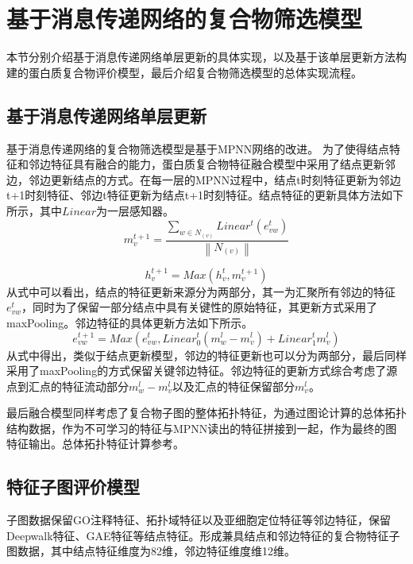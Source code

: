 \section{基于消息传递网络的复合物筛选模型}
\label{section:MPNN:detail}

本节分别介绍基于消息传递网络单层更新的具体实现，以及基于该单层更新方法构建的蛋白质复合物评价模型，最后介绍复合物筛选模型的总体实现流程。
\subsection{基于消息传递网络单层更新}
基于消息传递网络的复合物筛选模型是基于MPNN网络的改进。
为了使得结点特征和邻边特征具有融合的能力，蛋白质复合物特征融合模型中采用了结点更新邻边，邻边更新结点的方式。在每一层的MPNN过程中，结点t时刻特征更新为邻边t+1时刻特征、邻边t特征更新为结点t+1时刻特征。结点特征的更新具体方法如下所示，其中$Linear$为一层感知器。
\begin{equation}
    \label{equ:MineMPNNPassing}
    m_v^{t+1} = \frac{\sum_{w \in N_{(v)}}Linear^t(e_{vw}^t)}{\left\lVert N_{(v)}\right\rVert }
\end{equation}

\begin{equation}
    \label{equ:MineMPNNReadout}
    h_v^{t+1} = Max(h_v^t,m_v^{t+1})
\end{equation}
从式中可以看出，结点的特征更新来源分为两部分，其一为汇聚所有邻边的特征$e_{vw}^t$，同时为了保留一部分结点中具有关键性的原始特征，其更新方式采用了maxPooling。邻边特征的具体更新方法如下所示。
\begin{equation}
    \label{equ:MineMPNNedge}
    e_{vw}^{t+1} = Max(e_{vw}^t,Linear_0^t(m_w^{l} - m_v^{l}) + Linear_1^t m_v^{l})
\end{equation}
从式中得出，类似于结点更新模型，邻边的特征更新也可以分为两部分，最后同样采用了maxPooling的方式保留关键邻边特征。邻边特征的更新方式综合考虑了源点到汇点的特征流动部分$m_w^{l} - m_v^{l}$以及汇点的特征保留部分$m_v^{l}$。


最后融合模型同样考虑了复合物子图的整体拓扑特征，为通过图论计算的总体拓扑结构数据，作为不可学习的特征与MPNN读出的特征拼接到一起，作为最终的图特征输出。总体拓扑特征计算参考\cite{yu_predicting_2014}。

\subsection{特征子图评价模型}

子图数据保留GO注释特征、拓扑域特征以及亚细胞定位特征等邻边特征，保留Deepwalk特征、GAE特征等结点特征。形成兼具结点和邻边特征的复合物特征子图数据，其中结点特征维度为82维，邻边特征维度维12维。

